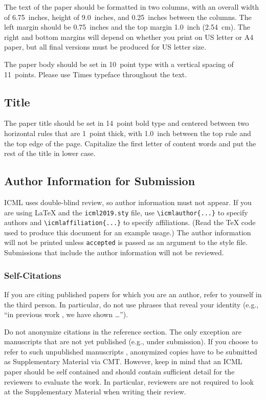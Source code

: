 \documentclass{article}
\begin{document}
The text of the paper should be formatted in two columns, with an
overall width of 6.75~inches, height of 9.0~inches, and 0.25~inches
between the columns. The left margin should be 0.75~inches and the top
margin 1.0~inch (2.54~cm). The right and bottom margins will depend on
whether you print on US letter or A4 paper, but all final versions
must be produced for US letter size.

The paper body should be set in 10~point type with a vertical spacing
of 11~points. Please use Times typeface throughout the text.

\subsection{Title}

The paper title should be set in 14~point bold type and centered
between two horizontal rules that are 1~point thick, with 1.0~inch
between the top rule and the top edge of the page. Capitalize the
first letter of content words and put the rest of the title in lower
case.

\subsection{Author Information for Submission}
\label{author info}

ICML uses double-blind review, so author information must not appear. If
you are using \LaTeX\/ and the \texttt{icml2019.sty} file, use
\verb+\icmlauthor{...}+ to specify authors and \verb+\icmlaffiliation{...}+ to specify affiliations. (Read the TeX code used to produce this document for an example usage.) The author information
will not be printed unless \texttt{accepted} is passed as an argument to the
style file.
Submissions that include the author information will not
be reviewed.

\subsubsection{Self-Citations}

If you are citing published papers for which you are an author, refer
to yourself in the third person. In particular, do not use phrases
that reveal your identity (e.g., ``in previous work \cite{langley00}, we
have shown \ldots'').

Do not anonymize citations in the reference section. The only exception are manuscripts that are
not yet published (e.g., under submission). If you choose to refer to
such unpublished manuscripts \cite{anonymous}, anonymized copies have
to be submitted
as Supplementary Material via CMT\@. However, keep in mind that an ICML
paper should be self contained and should contain sufficient detail
for the reviewers to evaluate the work. In particular, reviewers are
not required to look at the Supplementary Material when writing their
review.
\end{document}
